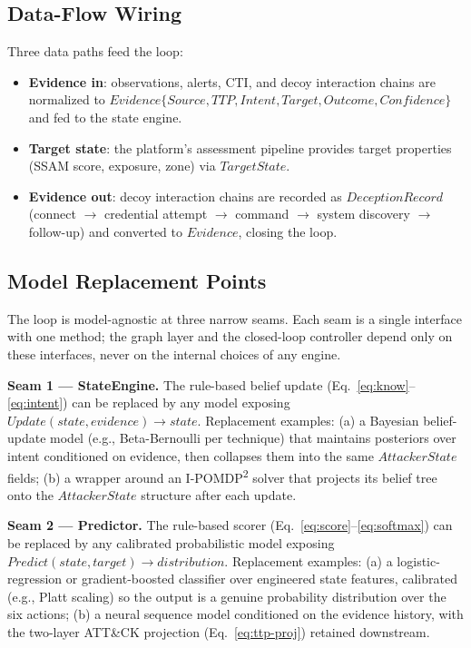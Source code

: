 \documentclass[preprints,article,accept,oneauthor]{Definitions/mdpi}
\begin{document}
\subsection{Data-Flow Wiring}

Three data paths feed the loop:
\begin{itemize}
\item \textbf{Evidence in}: observations, alerts, CTI, and decoy interaction
      chains are normalized to
      $\mathit{Evidence}\{\mathit{Source},\mathit{TTP},\mathit{Intent},
      \mathit{Target},\mathit{Outcome},\mathit{Confidence}\}$ and fed to the
      state engine.
\item \textbf{Target state}: the platform's assessment pipeline provides
      target properties (SSAM score, exposure, zone) via
      $\mathit{TargetState}$.
\item \textbf{Evidence out}: decoy interaction chains are recorded as
      $\mathit{DeceptionRecord}$ (connect $\to$ credential attempt $\to$
      command $\to$ system discovery $\to$ follow-up) and converted to
      $\mathit{Evidence}$, closing the loop.
\end{itemize}

\subsection{Model Replacement Points}
\label{sec:replacement}

The loop is model-agnostic at three narrow seams. Each seam is a single
interface with one method; the graph layer and the closed-loop controller
depend only on these interfaces, never on the internal choices of any
engine.

\textbf{Seam 1 --- StateEngine.} The rule-based belief update
(Eq.~\ref{eq:know}--\ref{eq:intent}) can be replaced by any model exposing
$\mathit{Update}(\mathit{state}, \mathit{evidence})
\to \mathit{state}$. Replacement examples: (a) a Bayesian belief-update
model (e.g., Beta-Bernoulli per technique) that maintains posteriors over
intent conditioned on evidence, then collapses them into the same
$\mathit{AttackerState}$ fields; (b) a wrapper around an
I-POMDP\textsuperscript{2} solver that projects its belief tree onto the
$\mathit{AttackerState}$ structure after each update.

\textbf{Seam 2 --- Predictor.} The rule-based scorer
(Eq.~\ref{eq:score}--\ref{eq:softmax}) can be replaced by any calibrated
probabilistic model exposing
$\mathit{Predict}(\mathit{state}, \mathit{target}) \to
\mathit{distribution}$. Replacement examples: (a) a logistic-regression or
gradient-boosted classifier over engineered state features, calibrated
(e.g., Platt scaling) so the output is a genuine probability distribution
over the six actions; (b) a neural sequence model conditioned on the
evidence history, with the two-layer ATT\&CK projection
(Eq.~\ref{eq:ttp-proj}) retained downstream.
\end{document}
